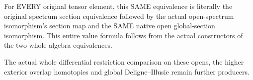 For EVERY original tensor element, this SAME equivalence is literally
the original spectrum section equivalence followed by the actual
open-spectrum isomorphism's section map and the SAME native open
global-section isomorphism. This entire value formula follows from
the actual constructors of the two whole algebra equivalences.

The actual whole differential restriction comparison on these
opens, the higher exterior overlap homotopies and global
Deligne--Illusie remain further producers.

